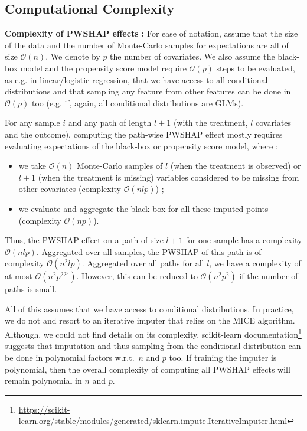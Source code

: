 \documentclass{article}
\theoremstyle{plain}
\theoremstyle{definition}
\theoremstyle{remark}
\theoremstyle{mystyle}
\begin{document}
\subsection{Computational Complexity}

\textbf{Complexity of PWSHAP effects :} For ease of notation, assume that the size of the data and the number of Monte-Carlo samples for expectations are all of size $\mathcal{O}(n)$. We denote by $p$ the number of covariates. We also assume the black-box model and the propensity score model require $\mathcal{O}(p)$ steps to be evaluated, as e.g. in linear/logistic regression, that we have access to all conditional distributions and that sampling any feature from other features can be done in $\mathcal{O}(p)$ too (e.g. if, again, all conditional distributions are GLMs).

For any sample $i$ and any path of length $l+1$ (with the treatment, $l$ covariates and the outcome), computing the path-wise PWSHAP effect mostly requires evaluating expectations of the black-box or propensity score model, where :
\begin{itemize}
\item we take $\mathcal{O}(n)$ Monte-Carlo samples of $l$ (when the treatment is observed) or $l+1$ (when the treatment is missing) variables considered to be missing from other covariates (complexity $\mathcal{O}(nlp)$) ;
\item we evaluate and aggregate the black-box for all these imputed points (complexity $\mathcal{O}(np)$).
\end{itemize}

Thus, the PWSHAP effect on a path of size $l+1$ for one sample has a complexity $\mathcal{O}(nlp)$. Aggregated over all samples, the PWSHAP of this path is of complexity $\mathcal{O}(n^2lp)$. Aggregated over all paths for all $l$, we have a complexity of at most $\mathcal{O}(n^2p^22^p)$. However, this can be reduced to $\mathcal{O}(n^2p^2)$ if the number of paths is small.

All of this assumes that we have access to conditional distributions. In practice, we do not and resort to an iterative imputer that relies on the MICE algorithm. Although, we could not find details on its complexity, scikit-learn documentation\footnote{\url{https://scikit-learn.org/stable/modules/generated/sklearn.impute.IterativeImputer.html}}  suggests that imputation and thus sampling from the conditional distribution can be done in polynomial factors w.r.t.~$n$ and $p$ too. If training the imputer is polynomial, then the overall complexity of computing all PWSHAP effects will remain polynomial in $n$ and $p$.
\end{document}
